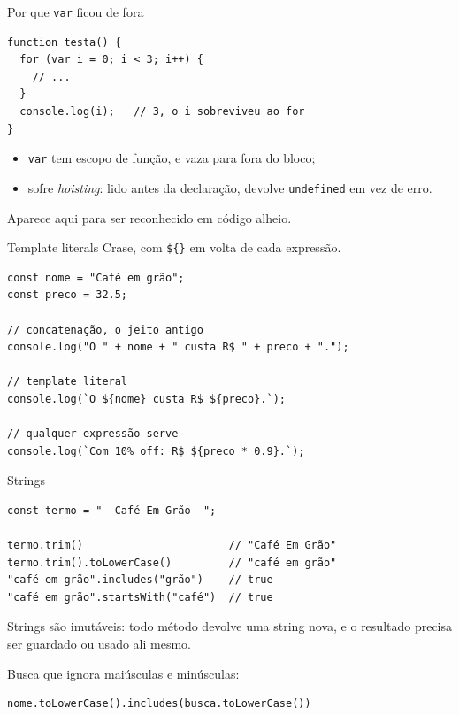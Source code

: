 \documentclass{beamer}
\begin{document}
\begin{frame}[fragile]{Por que \texttt{var} ficou de fora}
	\begin{verbatim}
function testa() {
  for (var i = 0; i < 3; i++) {
    // ...
  }
  console.log(i);   // 3, o i sobreviveu ao for
}
	\end{verbatim}

	\vspace{0.2cm}
	\begin{itemize}
		\item \texttt{var} tem escopo de função, e vaza para fora do bloco;
		\item sofre \emph{hoisting}: lido antes da declaração, devolve
		      \texttt{undefined} em vez de erro.
	\end{itemize}

	\vspace{0.2cm}
	Aparece aqui para ser reconhecido em código alheio.
\end{frame}

\begin{frame}[fragile]{Template literals}
	Crase, com \texttt{\$\{\}} em volta de cada expressão.

	\begin{verbatim}
const nome = "Café em grão";
const preco = 32.5;

// concatenação, o jeito antigo
console.log("O " + nome + " custa R$ " + preco + ".");

// template literal
console.log(`O ${nome} custa R$ ${preco}.`);

// qualquer expressão serve
console.log(`Com 10% off: R$ ${preco * 0.9}.`);
	\end{verbatim}
\end{frame}

\begin{frame}[fragile]{Strings}
	\begin{verbatim}
const termo = "  Café Em Grão  ";

termo.trim()                       // "Café Em Grão"
termo.trim().toLowerCase()         // "café em grão"
"café em grão".includes("grão")    // true
"café em grão".startsWith("café")  // true
	\end{verbatim}

	\vspace{0.2cm}
	Strings são imutáveis: todo método devolve uma string nova, e o resultado
	precisa ser guardado ou usado ali mesmo.

	\vspace{0.2cm}
	Busca que ignora maiúsculas e minúsculas:

	\begin{verbatim}
nome.toLowerCase().includes(busca.toLowerCase())
	\end{verbatim}
\end{frame}
\end{document}
